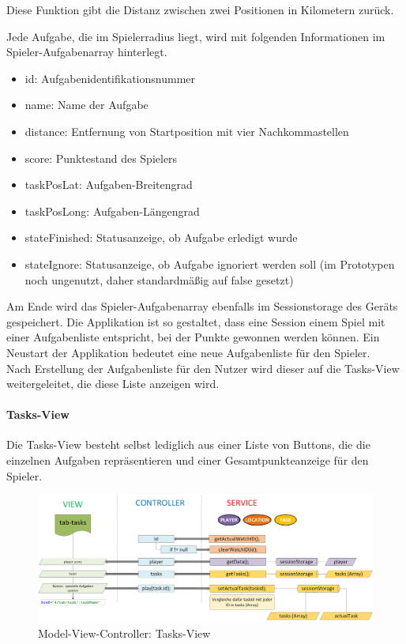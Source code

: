 Diese Funktion gibt die Distanz zwischen zwei Positionen in Kilometern zurück.


Jede Aufgabe, die im Spielerradius liegt, wird mit folgenden Informationen im Spieler-Aufgabenarray hinterlegt.
\begin{itemize}
\item id: Aufgabenidentifikationsnummer
\item name: Name der Aufgabe
\item distance: Entfernung von Startposition mit vier Nachkommastellen
\item score: Punktestand des Spielers
\item taskPosLat: Aufgaben-Breitengrad
\item taskPosLong: Aufgaben-Längengrad
\item stateFinished: Statusanzeige, ob Aufgabe erledigt wurde
\item stateIgnore: Statusanzeige, ob Aufgabe ignoriert werden soll (im Prototypen noch ungenutzt, daher standardmäßig auf false gesetzt)
\end{itemize}
Am Ende wird das Spieler-Aufgabenarray ebenfalls im Sessionstorage des Geräts gespeichert. Die Applikation ist so gestaltet, dass eine Session einem Spiel mit einer Aufgabenliste entspricht, bei der Punkte gewonnen werden können. Ein Neustart der Applikation bedeutet eine neue Aufgabenliste für den Spieler.
\\
Nach Erstellung der Aufgabenliste für den Nutzer wird dieser auf die Tasks-View weitergeleitet, die diese Liste anzeigen wird.
\paragraph{Tasks-View}
%
%
Die Tasks-View besteht selbst lediglich aus einer Liste von Buttons, die die einzelnen Aufgaben repräsentieren und einer Gesamtpunkteanzeige für den Spieler.
%
%
\begin{figure}[h]
\centering
\includegraphics[width=1\textwidth]{ref/images/04-tasks-tab.png}
\caption[Model-View-Controller: Tasks-View]{Model-View-Controller: Tasks-View}
\label{fig:MVC:Tasks-View}
\end{figure}
%
%


